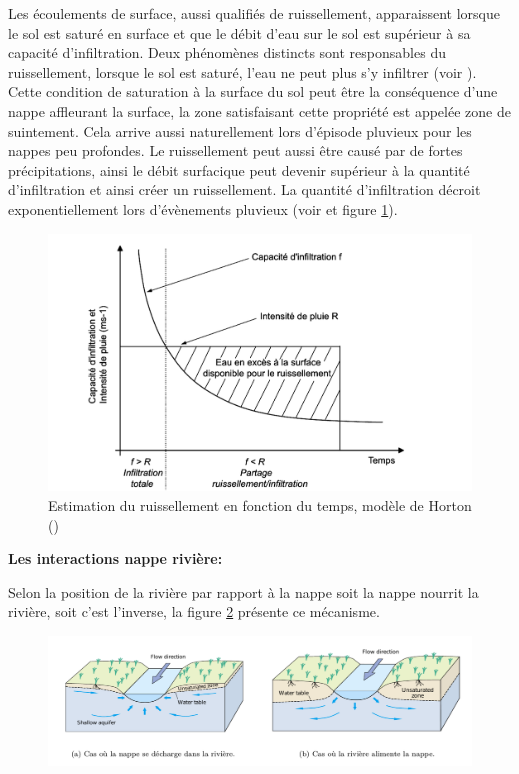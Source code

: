 \documentclass[a4paper,11pt]{article}
\numberwithin{equation}{section}
\begin{document}
Les écoulements de surface, aussi qualifiés de ruissellement, apparaissent lorsque le sol est saturé en surface et que le débit d'eau sur le sol est supérieur à sa capacité d'infiltration. Deux phénomènes distincts sont responsables du ruissellement, lorsque le sol est saturé, l’eau ne peut plus s’y infiltrer (voir \cite{cappus1960etude}). Cette condition de saturation à la surface du sol peut être la conséquence d'une nappe affleurant la surface, la zone satisfaisant cette propriété est appelée zone de suintement. Cela arrive aussi naturellement lors d'épisode pluvieux pour les nappes peu profondes. Le ruissellement peut aussi être causé par de fortes précipitations, ainsi le débit surfacique peut devenir supérieur à la quantité d'infiltration et ainsi créer un ruissellement. La quantité d'infiltration décroit exponentiellement lors d'évènements pluvieux (voir \cite{horton1933role} et figure \ref{fig-Horton}).  

\begin{figure}[H]
	\centering\includegraphics[scale=0.2]{ruissellement.png}
	\caption{Estimation du ruissellement en fonction du temps, modèle de Horton (\cite{maquin2016developpement})}
	\label{fig-Horton}
\end{figure}

\vspace{0.7cm}

\noindent\textbf{Les interactions nappe rivière:}

Selon la position de la rivière par rapport à la nappe soit la nappe nourrit la rivière, soit c'est l'inverse, la figure \ref{fig-nappe_riviere} présente ce mécanisme.

\begin{figure}[H]
	\begin{center}
		\includegraphics[scale=0.28]{nappe_riviere.png}
	\end{center}
	\label{fig-nappe_riviere}
\end{figure}
\end{document}
